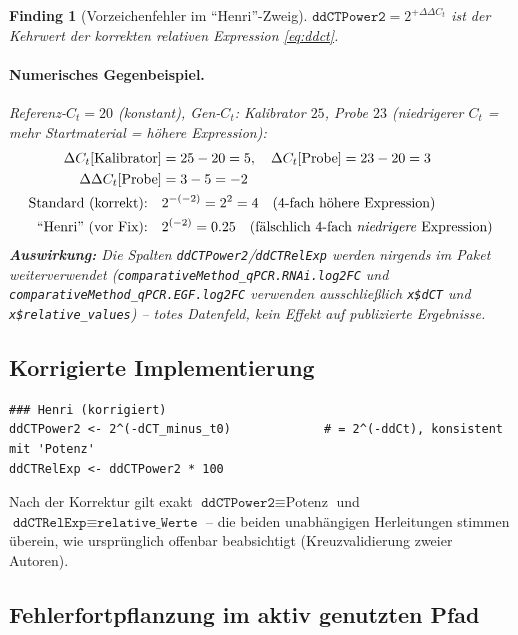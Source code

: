 \documentclass[11pt,a4paper]{article}
\newtheorem{finding}{Finding}
\begin{document}
\begin{finding}[Vorzeichenfehler im ``Henri''-Zweig]
\label{find:henri-bug}
$\texttt{ddCTPower2} = 2^{+\Delta\Delta C_t}$ ist der \emph{Kehrwert} der
korrekten relativen Expression \eqref{eq:ddct}.

\paragraph{Numerisches Gegenbeispiel.} Referenz-$C_t=20$ (konstant),
Gen-$C_t$: Kalibrator $25$, Probe $23$ (niedrigerer $C_t$ = mehr Startmaterial
= höhere Expression):
\begin{align*}
\Delta C_t[\text{Kalibrator}] &= 25-20=5, \quad \Delta C_t[\text{Probe}] = 23-20=3\\
\Delta\Delta C_t[\text{Probe}] &= 3-5 = -2\\
\text{Standard (korrekt):}\quad & 2^{-(-2)} = 2^{2} = 4 \quad\text{(4-fach h\"ohere Expression)}\\
\text{``Henri'' (vor Fix):}\quad & 2^{(-2)} = 0.25 \quad\text{(f\"alschlich 4-fach \emph{niedrigere} Expression)}
\end{align*}
\textbf{Auswirkung:} Die Spalten \texttt{ddCTPower2}/\texttt{ddCTRelExp}
werden nirgends im Paket weiterverwendet
(\texttt{comparativeMethod\_qPCR.RNAi.log2FC} und
\texttt{comparativeMethod\_qPCR.EGF.log2FC} verwenden ausschließlich
\texttt{x\$dCT} und \texttt{x\$relative\_values}) -- totes Datenfeld, kein
Effekt auf publizierte Ergebnisse.
\end{finding}

\subsection{Korrigierte Implementierung}

\begin{lstlisting}
### Henri (korrigiert)
ddCTPower2 <- 2^(-dCT_minus_t0)             # = 2^(-ddCt), konsistent mit 'Potenz'
ddCTRelExp <- ddCTPower2 * 100
\end{lstlisting}

Nach der Korrektur gilt exakt $\texttt{ddCTPower2} \equiv \text{Potenz}$ und
$\texttt{ddCTRelExp} \equiv \texttt{relative\_Werte}$ -- die beiden
unabhängigen Herleitungen stimmen überein, wie ursprünglich offenbar
beabsichtigt (Kreuzvalidierung zweier Autoren).

\subsection{Fehlerfortpflanzung im aktiv genutzten Pfad}
\end{document}
